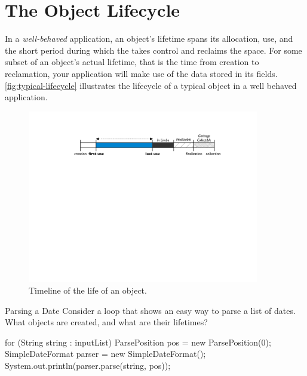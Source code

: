 \section{The Object Lifecycle}


In a \emph{well-behaved} application, an object's lifetime spans its allocation,
use, and the short period during which the \jre takes control and reclaims the
space. For some subset of an object's actual lifetime, that is the time from
creation to reclamation, your application will make use of the data stored in its
fields. \autoref{fig:typical-lifecycle} illustrates the lifecycle of a typical
object in a well behaved application.

\begin{figure}
	\includegraphics[width=0.9\textwidth]{part4/Figures/lifetime/object-lifecycle}
	\caption{Timeline of the life of an object.}
	\label{fig:typical-lifecycle}
\end{figure}

\begin{example}{Parsing a Date} Consider a loop that shows an easy way to parse
a list of dates. What objects are created, and what are their lifetimes?
\begin{shortlisting}
for (String string : inputList) {
	ParsePosition pos = new ParsePosition(0);
	SimpleDateFormat parser = new SimpleDateFormat();
	System.out.println(parser.parse(string, pos));
}
\end{shortlisting}
\end{example}

